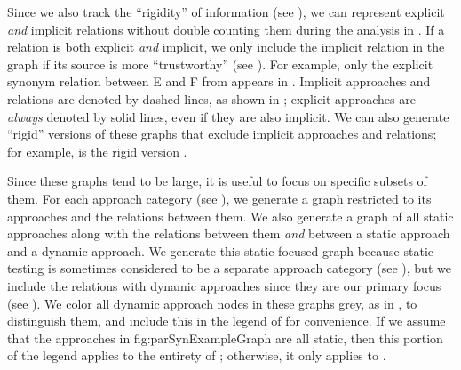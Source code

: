     \label{graphRigid}
    Since we also track the ``rigidity'' of information (see ),
    we can represent explicit
    \emph{and} implicit relations without double counting them during the
    analysis in . If a relation is both explicit
    \emph{and} implicit, we only include the implicit relation in the graph
    if its source is more ``trustworthy'' (see ).
    For example, only the explicit synonym relation between E and F
    from  appears in .
    Implicit approaches and relations are denoted by dashed lines, as shown
    in ; explicit approaches are
    \emph{always} denoted by solid lines, even if they are also implicit.
    We can also generate ``rigid'' versions of these graphs that exclude
    implicit approaches and relations; for example,
     is the rigid version .

\fi
Since these graphs tend to be large, it is useful to focus on specific
subsets of them. \ifnotpaper For each approach category (see
    ), we generate a graph restricted to its approaches
    and the relations between them. We also generate a graph of all static
    approaches along with the relations between them \emph{and} between a
    static approach and a dynamic approach. We generate this static-focused
    graph because static testing is sometimes considered to be a separate
    approach category (see ), but we include the
    relations with dynamic approaches since they are our primary focus
    (see ). We color all dynamic approach nodes in these
    graphs grey, as in , to distinguish them,
    and include this in the legend of  for convenience.
    If we assume that the approaches in 
    {fig:parSynExampleGraph} are all static, then this portion of the legend
    applies to the entirety of ; otherwise, it only
    applies to .

